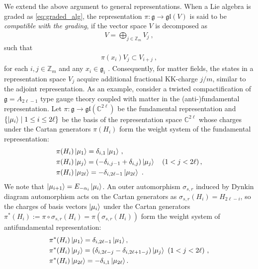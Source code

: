 We extend the above argument to general representations. When a Lie algebra is graded as \eqref{eq:graded_alg}, the representation $ \pi : \mathfrak{g} \to \mathfrak{gl}(V) $ is said to be {\it compatible with the grading}, if the vector space $ V $ is decomposed as
\begin{align}
V = \bigoplus_{j \in \mathbb{Z}_m} V_j\ ,
\end{align}
such that
\begin{align}
\pi(x_i) V_j \subset V_{i+j} \ ,
\end{align}
for each $ i, j \in \mathbb{Z}_m $ and any $ x_i \in \mathfrak{g}_i $ \cite{havlicek_representations_2009}. Consequently, for matter fields, the states in a representation space $ V_j $ acquire additional fractional KK-charge $ j/m $, similar to the adjoint representation. As an example, consider a twisted compactification of $ \mathfrak{g} = A_{2\ell-1} $ type gauge theory coupled with matter in the (anti-)fundamental representation. Let $ \pi : \mathfrak{g} \to \mathfrak{gl}(\mathbb{C}^{2\ell}) $ be the fundamental representation and $ \{\ket{\mu_i} \mid 1 \leq i \leq 2\ell \} $ be the basis of the representation space $ \mathbb{C}^{2\ell} $ whose charges under the Cartan generators $ \pi(H_i) $ form the weight system of the fundamental representation:
\begin{align}\label{eq:su(2l)_fund_weight}
&\pi(H_i) \ket{\mu_1} = \delta_{i,1} \ket{\mu_1} \, , \quad
\nonumber \\
&\pi(H_i) \ket{\mu_j} = (-\delta_{i,j-1} + \delta_{i,j}) \ket{\mu_j} \quad (1 < j < 2\ell) \, , \nonumber\\
&\pi(H_i) \ket{\mu_{2\ell}} = -\delta_{i,2\ell-1} \ket{\mu_{2\ell}}\ .
\end{align}
We note that $ \ket{\mu_{i+1}} = E_{-\alpha_{i}} \ket{\mu_i} $. An outer automorphism $ \sigma_{s,r} $ induced by Dynkin diagram automorphism acts on the Cartan generators as $ \sigma_{s,r}(H_i) = H_{2\ell-i} $, so the charges of basis vectors $ \ket{\mu_i} $ under the Cartan generators $ \pi^* (H_i) := \pi \circ \sigma_{s,r} (H_i)= \pi(\sigma_{s,r}(H_i)) $ form the weight system of antifundamental representation:
\begin{align}\label{eq:su(2l)_antifund_weight}
&\pi^*(H_i) \ket{\mu_1} = \delta_{i,2\ell-1} \ket{\mu_1}, \nonumber\\
&\pi^*(H_i) \ket{\mu_j} = (\delta_{i,2\ell-j} - \delta_{i,2\ell+1-j}) \ket{\mu_j} \ (1 < j < 2\ell) \ ,\nonumber \\
&\pi^*(H_i) \ket{\mu_{2\ell}} = -\delta_{i,1} \ket{\mu_{2\ell}}.
\end{align}

